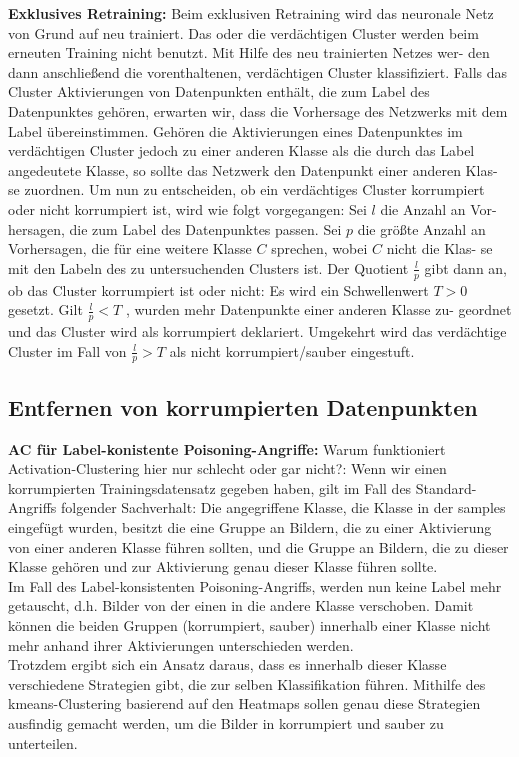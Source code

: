 \documentclass[11pt,a4paper]{article}
\numberwithin{equation}{section}
\begin{document}
		\noindent \textbf{Exklusives Retraining:} Beim exklusiven Retraining wird das neuronale Netz
		von Grund auf neu trainiert. Das oder die verdächtigen Cluster werden beim
		erneuten Training nicht benutzt. Mit Hilfe des neu trainierten Netzes wer-
		den dann anschließend die vorenthaltenen, verdächtigen Cluster klassifiziert.
		Falls das Cluster Aktivierungen von Datenpunkten enthält, die zum Label des
		Datenpunktes gehören, erwarten wir, dass die Vorhersage des Netzwerks mit
		dem Label übereinstimmen. Gehören die Aktivierungen eines Datenpunktes im
		verdächtigen Cluster jedoch zu einer anderen Klasse als die durch das Label
		angedeutete Klasse, so sollte das Netzwerk den Datenpunkt einer anderen Klas-
		se zuordnen. Um nun zu entscheiden, ob ein verdächtiges Cluster korrumpiert
		oder nicht korrumpiert ist, wird wie folgt vorgegangen: Sei $l$ die Anzahl an Vor-
		hersagen, die zum Label des Datenpunktes passen. Sei $p$ die größte Anzahl an
		Vorhersagen, die für eine weitere Klasse $C$ sprechen, wobei $C$ nicht die Klas-
		se mit den Labeln des zu untersuchenden Clusters ist. Der Quotient $\frac{l}{p}$ gibt
		dann an, ob das Cluster korrumpiert ist oder nicht: Es wird ein Schwellenwert
		$T > 0$ gesetzt. Gilt $\frac{l}{p} < T$ , wurden mehr Datenpunkte einer anderen Klasse zu-
		geordnet und das Cluster wird als korrumpiert deklariert. Umgekehrt wird das
		verdächtige Cluster im Fall von $\frac{l}{p} > T$ als nicht korrumpiert/sauber eingestuft.
	
		
	\subsection{Entfernen von korrumpierten Datenpunkten}
	
	\noindent \textbf{AC für Label-konistente Poisoning-Angriffe:} Warum funktioniert Activation-Clustering hier nur schlecht oder gar nicht?: Wenn wir einen korrumpierten Trainingsdatensatz gegeben haben, gilt im Fall des Standard-Angriffs folgender Sachverhalt: Die angegriffene Klasse, die Klasse in der samples eingefügt wurden, besitzt die eine Gruppe an Bildern, die zu einer Aktivierung von einer anderen Klasse führen sollten, und die Gruppe an Bildern, die zu dieser Klasse gehören und zur Aktivierung genau dieser Klasse führen sollte.\\
	Im Fall des Label-konsistenten Poisoning-Angriffs, werden nun keine Label mehr getauscht, d.h. Bilder von der einen in die andere Klasse verschoben. Damit können die beiden Gruppen (korrumpiert, sauber) innerhalb einer Klasse nicht mehr anhand ihrer Aktivierungen unterschieden werden.\\
	Trotzdem ergibt sich ein Ansatz daraus, dass es innerhalb dieser Klasse verschiedene \glqq Strategien\grqq{}  gibt, die zur selben Klassifikation führen. Mithilfe des kmeans-Clustering basierend auf den Heatmaps sollen genau diese Strategien ausfindig gemacht werden, um die Bilder in korrumpiert und sauber zu unterteilen.
	
\end{document}
